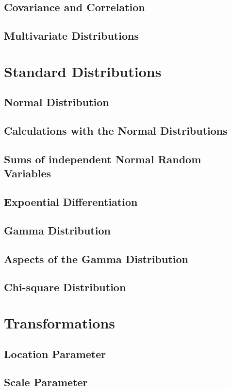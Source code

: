 \documentclass[11pt]{article}
\begin{document}
    \section{Covariance and Correlation}
    \section{Multivariate Distributions}

    \chapter{Standard Distributions}

    \section{Normal Distribution}
    \section{Calculations with the Normal Distributions}
    \section{Sums of independent Normal Random Variables}
    \section{Expoential Differentiation}
    \section{Gamma Distribution}
    \section{Aspects of the Gamma Distribution}
    \section{Chi-square Distribution}

    \chapter{Transformations}

    \section{Location Parameter}
    \section{Scale Parameter}
\end{document}
